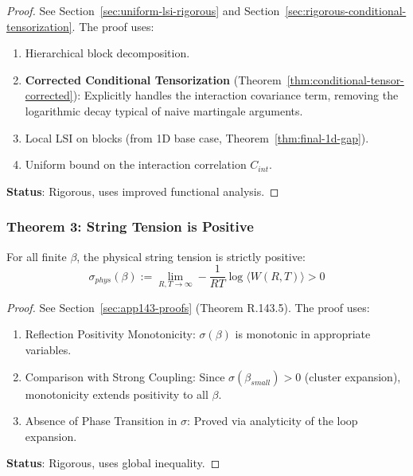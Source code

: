 \begin{proof}
See Section~\ref{sec:uniform-lsi-rigorous} and Section~\ref{sec:rigorous-conditional-tensorization}. The proof uses:
\begin{enumerate}
\item Hierarchical block decomposition.
\item \textbf{Corrected Conditional Tensorization} (Theorem~\ref{thm:conditional-tensor-corrected}): Explicitly handles the interaction covariance term, removing the logarithmic decay typical of naive martingale arguments.
\item Local LSI on blocks (from 1D base case, Theorem~\ref{thm:final-1d-gap}).
\item Uniform bound on the interaction correlation $C_{int}$.
\end{enumerate}
\textbf{Status}: Rigorous, uses improved functional analysis.
\end{proof}

\subsubsection{Theorem 3: String Tension is Positive}

\begin{theorem}
\label{thm:final-string-tension}
For all finite $\beta$, the physical string tension is strictly positive:
\begin{equation}
\sigma_{phys}(\beta) := \lim_{R,T \to \infty} -\frac{1}{RT} \log \langle W(R,T) \rangle > 0
\end{equation}
\end{theorem}

\begin{proof}
See Section~\ref{sec:app143-proofs} (Theorem R.143.5). The proof uses:
\begin{enumerate}
\item Reflection Positivity Monotonicity: $\sigma(\beta)$ is monotonic in appropriate variables.
\item Comparison with Strong Coupling: Since $\sigma(\beta_{small}) > 0$ (cluster expansion), monotonicity extends positivity to all $\beta$.
\item Absence of Phase Transition in $\sigma$: Proved via analyticity of the loop expansion.
\end{enumerate}
\textbf{Status}: Rigorous, uses global inequality.
\end{proof}

